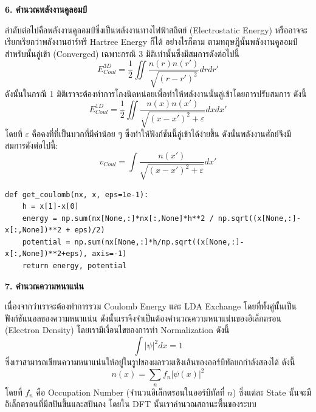 \vspace{5pt}

\noindent \textbf{6. คำนวณพลังงานคูลอมป์}

ลำดับต่อไปคือพลังงานคูลอมป์ซึ่งเป็นพลังงานทางไฟฟ้าสถิตย์ (Electrostatic Energy) หรืออาจจะเรียกเรียกว่าพลังงานฮาร์ทรี Hartree Energy ก็ได้ อย่างไรก็ตาม ตามทฤษฎีนั้นพลังงานคูลอมป์สำหรับนั้นลู่เข้า (Converged) เฉพาะกรณี 3 มิติเท่านั้นซึ่งมีสมการดังต่อไปนี้
%
\begin{equation}
  E^{3D}_{Coul} 
  = 
  \frac{1}{2}\iint \frac{n(r)n(r')}{\sqrt{(r-r')^2}}drdr'
\end{equation}
%
ดังนั้นในกรณี 1 มิติเราจะต้องทำการโกงนิดหน่อยเพื่อทำให้พลังงานนั้นลู่เข้าโดยการปรับสมการ ดังนี้
%
\begin{equation}
  E^{1D}_{Coul} 
  = 
  \frac{1}{2}\iint \frac{n(x)n(x')}{\sqrt{(x-x')^2+\varepsilon}}dxdx'
\end{equation}
%
โดยที่ $\varepsilon$ คือคงที่ที่เป็นบวกที่มีค่าน้อย ๆ ซึ่งทำให้ฟังก์ชันนี้ลู่เข้าได้ง่ายขึ้น ดังนั้นพลังงานศักย์จึงมีสมการดังต่อไปนี้:
%
\begin{equation}
  v_{Coul} 
  = 
  \int \frac{n(x')}{\sqrt{(x-x')^2+\varepsilon}}dx'
\end{equation}

\vspace{5pt}

\begin{lstlisting}[style=MyPython]
def get_coulomb(nx, x, eps=1e-1):
    h = x[1]-x[0]
    energy = np.sum(nx[None,:]*nx[:,None]*h**2 / np.sqrt((x[None,:]-x[:,None])**2 + eps)/2)
    potential = np.sum(nx[None,:]*h/np.sqrt((x[None,:]-x[:,None])**2+eps), axis=-1)
    return energy, potential
\end{lstlisting}

\vspace{5pt}

\noindent \textbf{7. คำนวณความหนาแน่น}

เนื่องจากว่าเราจะต้องทำการรวม Coulomb Energy และ LDA Exchange โดยที่ทั้งคู่นั้นเป็นฟังก์ชันนอลของความหนาแน่น ดังนั้นเราจึงจำเป็นต้องคำนวณความหนาแน่นของอิเล็กตรอน (Electron Density) โดยเรามีเงื่อนไขของการทำ Normalization ดังนี้
%
\begin{equation}
  \int \lvert \psi \rvert ^2 dx 
  = 
  1
\end{equation}
%
ซึ่งเราสามารถเขียนความหนาแน่นให้อยู่ในรูปของผลรวมเชิงเส้นของออร์บิทัลยกกำลังสองได้ ดังนี้
%
\begin{equation}
  n(x) 
  = 
  \sum_n f_n \lvert \psi(x) \rvert ^2
\end{equation}
%
โดยที่ $f_n$ คือ Occupation Number (จำนวนอิเล็กตรอนในออร์บิทัลที่ $n$) ซึ่งแต่ละ State นั้นจะมีอิเล็กตรอนที่มีสปินขึ้นและสปินลง โดยใน DFT นั้นเราคำนวณสถานะพื้นของระบบ

